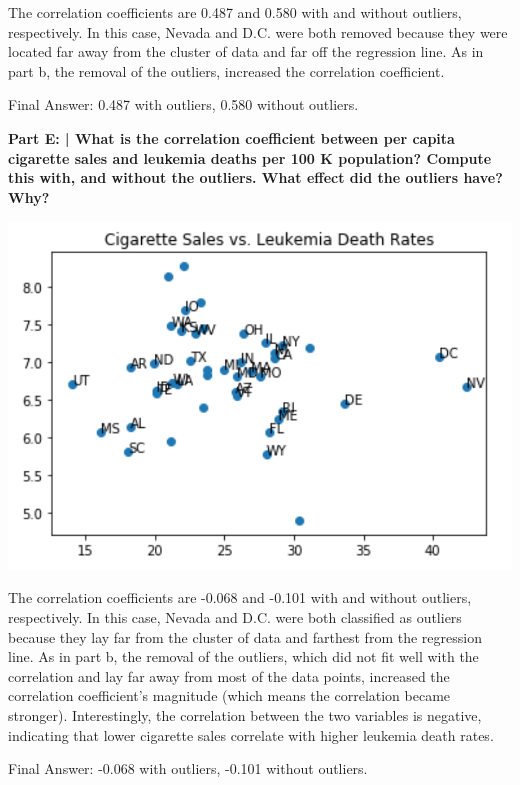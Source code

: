\documentclass{article}
\begin{document}
 The correlation coefficients are 0.487 and 0.580 with and without outliers, respectively. In this case, Nevada and D.C. were both removed because they were located far away from the cluster of data and far off the regression line. As in part b, the removal of the outliers, increased the correlation coefficient.\newline
 
 Final Answer: 0.487 with outliers, 0.580 without outliers.\newline
 
 \textbf{Part E: | What is the correlation coefficient between per capita cigarette sales and leukemia deaths per 100 K population? Compute this with, and without the outliers. What effect did the outliers have? Why?}\newline
  
 \includegraphics{HW2_4.PNG}

 The correlation coefficients are -0.068 and -0.101 with and without outliers, respectively. In this case, Nevada and D.C. were both classified as outliers because they lay far from the cluster of data and farthest from the regression line. As in part b, the removal of the outliers, which did not fit well with the correlation and lay far away from most of the data points, increased the correlation coefficient's magnitude (which means the correlation became stronger). Interestingly, the correlation between the two variables is negative, indicating that lower cigarette sales correlate with higher leukemia death rates. \newline
 
 Final Answer: -0.068 with outliers, -0.101 without outliers.\newline
 
\end{document}
